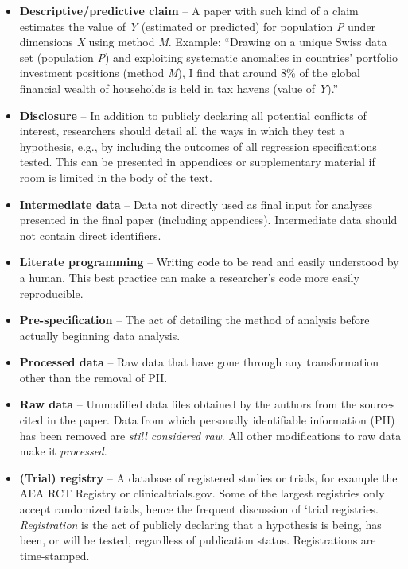 \documentclass[]{book}
\begin{document}
\begin{itemize}
\item
  \textbf{Descriptive/predictive claim} -- A paper with such kind of a claim estimates the value of \emph{Y} (estimated or predicted) for population \emph{P} under dimensions \emph{X} using method \emph{M}. Example: ``Drawing on a unique Swiss data set (population \emph{P}) and exploiting systematic anomalies in countries' portfolio investment positions (method \emph{M}), I find that around 8\% of the global financial wealth of households is held in tax havens (value of \emph{Y}).''\\
\item
  \textbf{Disclosure} -- In addition to publicly declaring all potential conflicts of interest, researchers should detail all the ways in which they test a hypothesis, e.g., by including the outcomes of all regression specifications tested. This can be presented in appendices or supplementary material if room is limited in the body of the text.
\item
  \textbf{Intermediate data} -- Data not directly used as final input for analyses presented in the final paper (including appendices). Intermediate data should not contain direct identifiers.
\item
  \textbf{Literate programming} -- Writing code to be read and easily understood by a human. This best practice can make a researcher's code more easily reproducible.
\item
  \textbf{Pre-specification} -- The act of detailing the method of analysis before actually beginning data analysis.
\item
  \textbf{Processed data} -- Raw data that have gone through any transformation other than the removal of PII.\\
\item
  \textbf{Raw data} -- Unmodified data files obtained by the authors from the sources cited in the paper. Data from which personally identifiable information (PII) has been removed are \emph{still considered raw}. All other modifications to raw data make it \emph{processed}.\\
\item
  \textbf{(Trial) registry} -- A database of registered studies or trials, for example the AEA RCT Registry or clinicaltrials.gov. Some of the largest registries only accept randomized trials, hence the frequent discussion of `trial registries. \emph{Registration} is the act of publicly declaring that a hypothesis is being, has been, or will be tested, regardless of publication status. Registrations are time-stamped.

\end{itemize}
\end{document}

